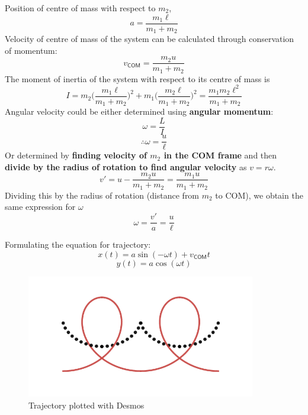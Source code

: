 \documentclass[12pt,a4paper]{extreport}
\numberwithin{equation}{chapter}
\begin{document}
    Position of centre of mass with respect to $m_2$,
    \begin{equation}
        a=\frac{m_1 \ell}{m_1+m_2}
    \end{equation}
    Velocity of centre of mass of the system can be calculated through conservation of momentum:
    \begin{equation}
        v_{\textsf{COM}}=\frac{m_2u}{m_1+m_2}
    \end{equation}
    The moment of inertia of the system with respect to its centre of mass is
    \begin{equation}
        I=m_2 \bigg(\frac{m_1 \ell}{m_1+m_2}\bigg)^2+m_1\bigg(\frac{m_2 \ell}{m_1+m_2}\bigg)^2=\frac{m_1 m_2 \ell^2}{m_1+m_2}
    \end{equation}
    Angular velocity could be either determined using \textbf{angular momentum}:
    \begin{equation}
        \omega=\frac{L}{I}
    \end{equation}
    \begin{equation}
        \therefore\omega=\frac{u}{\ell}
    \end{equation}
    Or determined by \textbf{finding velocity of $m_2$ in the COM frame} and then \textbf{divide by the radius of rotation to find angular velocity} as $v=r\omega$.
    \begin{equation}
        v'=u-\frac{m_2 u}{m_1+m_2}=\frac{m_1 u}{m_1+m_2}
    \end{equation}
    Dividing this by the radius of rotation (distance from $m_2$ to COM), we obtain the same expression for $\omega$
    \begin{equation}
        \omega= \frac{v'}{a}=\frac{u}{\ell}
    \end{equation}
   
    Formulating the equation for trajectory:
    \begin{equation}
        x(t)=a \sin (-\omega t)+v_{\textsf{COM}}t
    \end{equation}
    \begin{equation}
        y(t)=a \cos(\omega t)
    \end{equation}
    \begin{figure}[H]
    \centering
        \includegraphics[width=10cm]{graph latex.jpeg}
        \caption{Trajectory plotted with Desmos}
        \label{fig:2}
    \end{figure}
\end{document}
